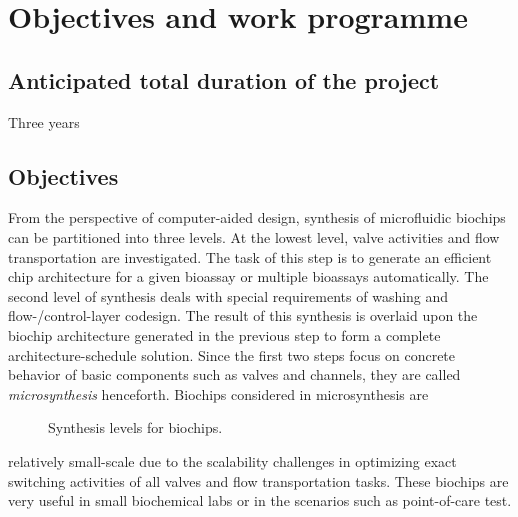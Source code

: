 \section{Objectives and work programme}
\subsection{Anticipated total duration of the project}
Three years

\vskip 10pt
\subsection{Objectives}



From the perspective of computer-aided design,
synthesis of microfluidic biochips can be partitioned 
into three levels. At
the lowest level, valve activities and flow transportation are investigated. 
The task of this step %
is to generate an efficient chip architecture for a given bioassay or
multiple bioassays automatically. 
The second level of synthesis deals with special requirements of washing and
flow-/control-layer codesign. The result of this synthesis is overlaid upon
the biochip architecture generated in the previous step to form a complete
architecture-schedule solution. Since the first two steps focus on concrete
behavior of basic components such as valves and channels, they are called
\textit{microsynthesis} henceforth.
Biochips considered in microsynthesis are 
\begin{wrapfigure}[22]{r}{0.53\textwidth}
{
\vskip 2pt
\figurefontsize
\centering

\caption{Synthesis levels for biochips.} 
\label{fig:task_relation}
}
\end{wrapfigure}
relatively small-scale due to
the scalability challenges in optimizing exact switching activities of all
valves and flow transportation tasks. 
These biochips %
are very useful in small biochemical labs or in the scenarios such
as point-of-care test. 

